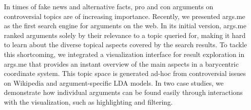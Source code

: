 In times of fake news and alternative facts, pro and con arguments on controversial topics are of increasing importance. Recently, we presented args.me as the first search engine for arguments on the web. In its initial version, args.me ranked arguments solely by their relevance to a topic queried for, making it hard to learn about the diverse topical aspects covered by the search results. To tackle this shortcoming, we integrated a visualization interface for result exploration in args.me that provides an instant overview of the main aspects in a barycentric coordinate system. This topic space is generated ad-hoc from controversial issues on Wikipedia and argument-specific LDA models. In two case studies, we demonstrate how individual arguments can be found easily through interactions with the visualization, such as highlighting and filtering.

